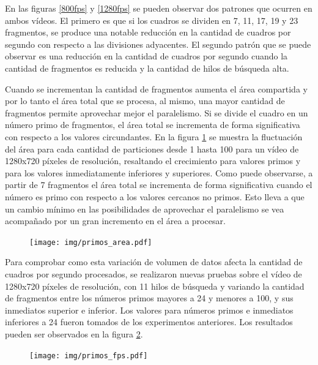 En las figuras \ref{800fps} y \ref{1280fps} se pueden observar dos patrones que
ocurren en ambos vídeos. El primero es que si los cuadros se dividen en 7, 11,
17, 19 y 23 fragmentos, se produce una notable reducción en la cantidad de
cuadros por segundo con respecto a las divisiones adyacentes. El segundo patrón
que se puede observar es una reducción en la cantidad de cuadros por segundo
cuando la cantidad de fragmentos es reducida y la cantidad de hilos de búsqueda
alta.

Cuando se incrementan la cantidad de fragmentos aumenta el área compartida y por
lo tanto el área total que se procesa, al mismo, una mayor cantidad de
fragmentos permite aprovechar mejor el paralelismo. Si se divide el cuadro en un
número primo de fragmentos, el área total se incrementa de forma significativa
con respecto a los valores circundantes. En la figura \ref{primosArea} se
muestra la fluctuación del área para cada cantidad de particiones desde 1 hasta
100 para un vídeo de 1280x720 píxeles de resolución, resaltando el crecimiento
para valores primos y para los valores inmediatamente inferiores y superiores.
Como puede observarse, a partir de 7 fragmentos el área total se incrementa de
forma significativa cuando el número es primo con respecto a los valores
cercanos no primos. Esto lleva a que un cambio mínimo en las posibilidades de
aprovechar el paralelismo se vea acompañado por un gran incremento en el área a
procesar.

\begin{figure}[!h]

	\texttt{[image: img/primos\_area.pdf]}
	\caption{}
	\label{primosArea}

\end{figure}

Para comprobar como esta variación de volumen de datos afecta la cantidad de
cuadros por segundo procesados, se realizaron nuevas pruebas sobre el vídeo de
1280x720 píxeles de resolución, con 11 hilos de búsqueda y variando la cantidad
de fragmentos entre los números primos mayores a 24 y menores a 100, y sus
inmediatos superior e inferior. Los valores para números primos e inmediatos
inferiores a 24 fueron tomados de los experimentos anteriores. Los resultados
pueden ser observados en la figura \ref{primosFPS}.

\begin{figure}[!h]

	\texttt{[image: img/primos\_fps.pdf]}
	\caption{}
	\label{primosFPS}

\end{figure}

